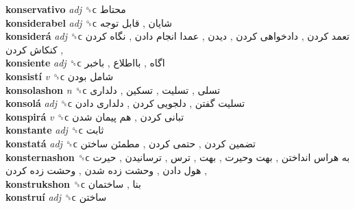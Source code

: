 \textbf{konservativo} \emph{adj}  ␝ϲ   محتاط   \\
\textbf{konsiderabel} \emph{adj}  ␝ϲ   شایان ,  قابل توجه   \\
\textbf{konsiderá} \emph{adj}  ␝ϲ   تعمد کردن ,  دادخواهی کردن ,  دیدن ,  عمدا انجام دادن ,  نگاه کردن ,  کنکاش کردن   \\
\textbf{konsiente} \emph{adj}  ␝ϲ   اگاه ,  بااطلاع ,  باخبر   \\
\textbf{konsistí} \emph{v}  ␝ϲ   شامل بودن   \\
\textbf{konsolashon} \emph{n}  ␝ϲ   تسلی ,  تسلیت ,  تسکین ,  دلداری   \\
\textbf{konsolá} \emph{adj}  ␝ϲ   تسلیت گفتن ,  دلجویی کردن ,  دلداری دادن   \\
\textbf{konspirá} \emph{v}  ␝ϲ   تبانی کردن ,  هم پیمان شدن   \\
\textbf{konstante} \emph{adj}  ␝ϲ   ثابت   \\
\textbf{konstatá} \emph{adj}  ␝ϲ   تضمین کردن ,  حتمی کردن ,  مطمئن ساختن   \\
\textbf{konsternashon} ␝ϲ   به هراس انداختن ,  بهت وحیرت ,  بهت ,  ترس ,  ترسانیدن ,  حیرت ,  هول دادن ,  وحشت زده شدن ,  وحشت زده کردن   \\
\textbf{konstrukshon} ␝ϲ   بنا ,  ساختمان   \\
\textbf{konstruí} \emph{adj}  ␝ϲ   ساختن   \\
